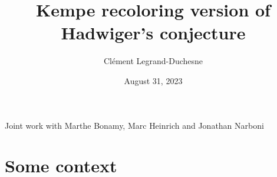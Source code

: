 \documentclass[11pt,xcolor=dvipsnames,presentation,aspectratio=169]{beamer}
\newcommand{\myorange}{Orange}
\newcommand{\mycyan}{LightSeaGreen}
\begin{document}
\title{Kempe recoloring version of Hadwiger's conjecture}
\author[Clément Legrand]{Clément Legrand-Duchesne}
\date{August 31, 2023}

\begin{frame}
  \titlepage

  \centering
  Joint work with Marthe Bonamy, Marc Heinrich and Jonathan Narboni
\end{frame}

\section*{Some context}

      

  
\end{document}
